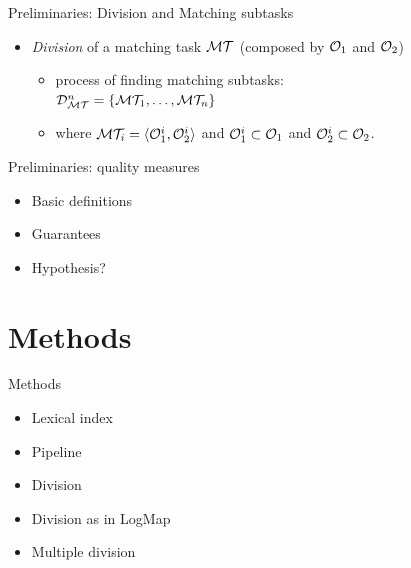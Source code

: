 \documentclass[t]{beamer}
\begin{document}
\begin{frame}{Preliminaries: Division and Matching subtasks}
	
  		\begin{itemize}    
  			\item \emph{Division} of a matching task $\mathcal{M}\mathcal{T}$ (composed by
$\mathcal{O}_1$ and $\mathcal{O}_2$) 
		\begin{itemize}
			\item process of finding matching subtasks: \\
			$\mathcal{D}_{\mathcal{M}\mathcal{T}}^{n}=\{\mathcal{M}\mathcal{T}_1,\ldots,\mathcal{M}\mathcal{T}_n\}$
			\item where $\mathcal{M}\mathcal{T}_{i}=\langle \mathcal{O}_1^{i}, \mathcal{O}_2^{i} \rangle$ and  $\mathcal{O}_1^{i} \subset \mathcal{O}_1$ and $\mathcal{O}_2^{i} \subset
\mathcal{O}_2$. 
		\end{itemize}
  	
		\end{itemize}
  	
\end{frame}



\begin{frame}{Preliminaries: quality measures}
	
  		\begin{itemize}    
  			\item Basic definitions
  			\item Guarantees
  			\item Hypothesis?
		\end{itemize}
  	
\end{frame}


\section{Methods}


\begin{frame}{Methods}
	
  		\begin{itemize}    
  			\item Lexical index
  			\item Pipeline
  			\item Division
  			\item Division as in LogMap
  			\item Multiple division
		\end{itemize}
  	
\end{frame}
\end{document}
